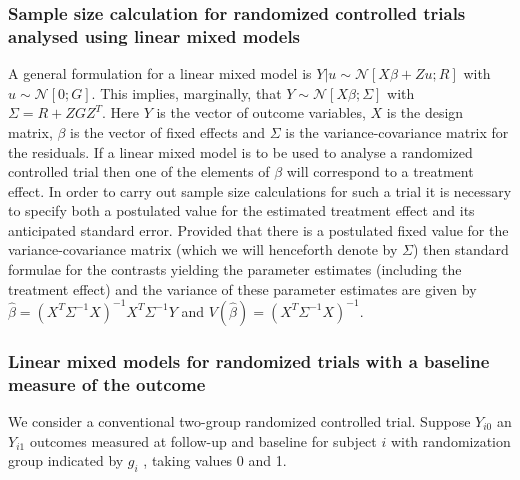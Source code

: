 \documentclass[final, paper=letter,5p,times,twocolumn]{elsarticle}
\theoremstyle{definition}
\begin{document}
\subsubsection{Sample size calculation for randomized controlled trials analysed using linear mixed models}

A general formulation for a linear mixed model is $Y|u \sim \mathcal{N}\left[ X\beta + Zu ; R\right]$ with $u \sim \mathcal{N}[0;G]$. This implies, marginally, that $Y \sim \mathcal{N}\left[ X\beta ; \Sigma\right]$ with $\Sigma = R + ZGZ^{T}$. Here $Y$ is the vector of outcome variables, $X$ is the design matrix, $\beta$ is the vector of fixed effects and $\Sigma$ is the variance-covariance matrix for the residuals. If a linear mixed model is to be used to analyse a randomized controlled trial then one of the elements of $\beta$ will correspond to a treatment effect. In order to carry out sample size calculations for such a trial it is necessary to specify both a postulated value for the estimated treatment effect and its anticipated standard error. Provided that there is a postulated fixed value for the variance-covariance matrix (which we will henceforth denote by $\Sigma$) then standard formulae for the contrasts yielding the parameter estimates (including the treatment effect) and the variance of these parameter estimates are given by $\hat{\beta} = (X^{T}\Sigma^{-1}X)^{-1}X^{T}\Sigma^{-1}Y$ and $V(\hat{\beta}) = (X^{T}\Sigma^{-1}X)^{-1}$.

\subsubsection{Linear mixed models for randomized trials with a baseline measure of the outcome}

We consider a conventional two-group randomized controlled trial. Suppose $Y_{i0}$ an $Y_{i1}$ outcomes measured at follow-up and baseline for subject $i$ with randomization group indicated by $g_{i}$ , taking values 0 and 1.
\end{document}
